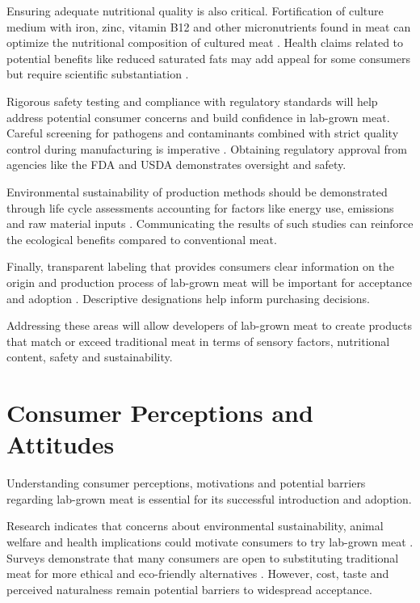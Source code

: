 \documentclass[10pt]{article}
\begin{document}
\begin{sloppypar}
  Ensuring adequate nutritional quality is also critical. Fortification of culture medium with iron, zinc, vitamin B12 and other micronutrients found in meat can optimize the nutritional composition of cultured meat \citep{fraeye_sensorial_2020}. Health claims related to potential benefits like reduced saturated fats may add appeal for some consumers but require scientific substantiation \citep{sergelidis_lab_2019}.

  Rigorous safety testing and compliance with regulatory standards will help address potential consumer concerns and build confidence in lab-grown meat. Careful screening for pathogens and contaminants combined with strict quality control during manufacturing is imperative \citep{ong_food_2021}. Obtaining regulatory approval from agencies like the FDA and USDA demonstrates oversight and safety.

  Environmental sustainability of production methods should be demonstrated through life cycle assessments accounting for factors like energy use, emissions and raw material inputs \citep{mattick_anticipatory_2015}. Communicating the results of such studies can reinforce the ecological benefits compared to conventional meat.

  Finally, transparent labeling that provides consumers clear information on the origin and production process of lab-grown meat will be important for acceptance and adoption \citep{failla_evaluation_2023}. Descriptive designations help inform purchasing decisions.

  Addressing these areas will allow developers of lab-grown meat to create products that match or exceed traditional meat in terms of sensory factors, nutritional content, safety and sustainability.

  \section{Consumer Perceptions and Attitudes}
  \label{sec:consumer-perceptions-and-attitudes}

  Understanding consumer perceptions, motivations and potential barriers regarding lab-grown meat is essential for its successful introduction and adoption.

  Research indicates that concerns about environmental sustainability, animal welfare and health implications could motivate consumers to try lab-grown meat \citep{circus_exploring_2018}. Surveys demonstrate that many consumers are open to substituting traditional meat for more ethical and eco-friendly alternatives \citep{verbeke_would_2015}. However, cost, taste and perceived naturalness remain potential barriers to widespread acceptance.


\end{sloppypar}
\end{document}
